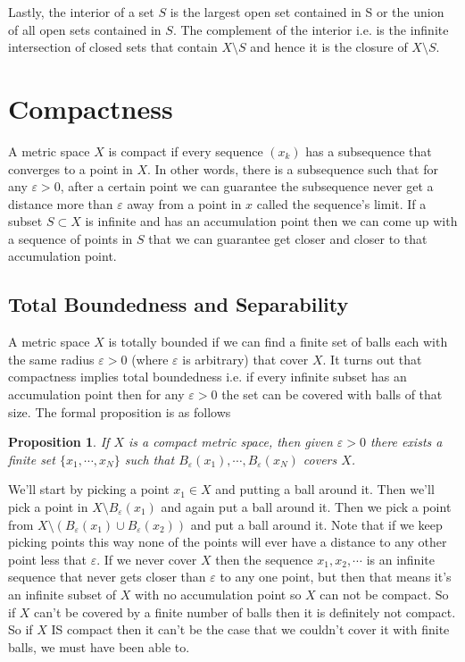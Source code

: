 \documentclass[oneside]{book}
\newtheorem{proposition}[theorem]{Proposition}
\newenvironment{proof}[1][Proof]{\begin{trivlist}
\item[\hskip \labelsep {\bfseries #1}]}{\end{trivlist}}
\begin{document}
Lastly, the interior of a set $S$ is the largest open set contained in S or the union of all open sets contained in $S$. The complement of the interior i.e. is the infinite intersection of closed sets that contain $X \setminus S$ and hence it is the closure of $X \setminus S$. 


\section{Compactness}
A metric space $X$ is compact if every sequence $(x_k)$ has a subsequence that converges to a point in $X$. In other words, there is a subsequence such that for any $\varepsilon >0$, after a certain point we can guarantee the subsequence never get a distance more than $\varepsilon$ away from a point in $x$ called the sequence's limit. If a subset $S \subset X$ is infinite and has an accumulation point then we can come up with a sequence of points in $S$ that we can guarantee get closer and closer to that accumulation point.  

\subsection{Total Boundedness and Separability}
A metric space $X$ is totally bounded if we can find a finite set of balls each with the same radius $\varepsilon >0$ (where $\varepsilon$ is arbitrary) that cover $X$. It turns out that compactness implies total boundedness i.e. if every infinite subset has an accumulation point then for any $\varepsilon >0$ the set can be covered with balls of that size. The formal proposition is as follows

\begin{proposition}
If $X$ is a compact metric space, then given $\varepsilon >0$ there exists a finite set $\{x_1, \cdots, x_N\}$ such that $B_\varepsilon(x_1), \cdots, B_\varepsilon(x_N)$ covers $X$.
\end{proposition}

\begin{proof}
We'll start by picking a point $x_1 \in X$ and putting a ball around it. Then we'll pick a point in $X \setminus B_\varepsilon(x_1)$ and again put a ball around it. Then we pick a point from $X \setminus (B_\varepsilon(x_1) \cup B_\varepsilon(x_2))$ and put a ball around it. Note that if we keep picking points this way none of the points will ever have a distance to any other point less that $\varepsilon$. If we never cover $X$ then the sequence $x_1, x_2,\cdots$ is an infinite sequence that never gets closer than $\varepsilon$ to any one point, but then that means it's an infinite subset of $X$ with no accumulation point so $X$ can not be compact. So if $X$ can't be covered by a finite number of balls then it is definitely not compact. So if $X$ IS compact then it can't be the case that we couldn't cover it with finite balls, we must have been able to. 
\end{proof}
\end{document}
